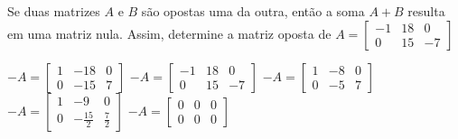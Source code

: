 Se duas matrizes $A$ e $B$ são opostas uma da outra, então a soma $A+B$ resulta em uma matriz nula. Assim, determine a matriz oposta de $A=\left[ \begin{array}{ccc}
-1 & 18 & 0 \\
0 & 15 & -7
\end{array} \right]$

$-A=\left[ \begin{array}{ccc} 1 & -18 & 0 \\ 0 & -15 & 7 \end{array} \right]$
$-A=\left[ \begin{array}{ccc} -1 & 18 & 0 \\ 0 & 15 & -7 \end{array} \right]$
$-A=\left[ \begin{array}{ccc} 1 & -8 & 0 \\ 0 & -5 & 7 \end{array} \right]$
$-A=\left[ \begin{array}{ccc} 1 & -9 & 0 \\ 0 & -\frac{15}{2} & \frac{7}{2} \end{array} \right]$
$-A=\left[ \begin{array}{ccc} 0 & 0 & 0 \\ 0 & 0 & 0 \end{array} \right]$



